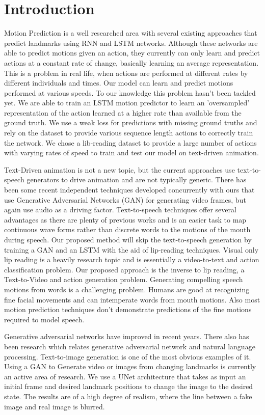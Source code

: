 \documentclass[10pt,twocolumn,letterpaper]{article}
\begin{document}
\section{Introduction}
 Motion Prediction is a well researched area with several existing approaches that predict landmarks using RNN and LSTM networks. Although these networks are able to predict motions given an action, they currently can only learn and predict actions at a constant rate of change, basically learning an average representation. This is a problem in real life, when actions are performed at different rates by different individuals and times. Our model can learn and predict motions performed at various speeds. To our knowledge this problem hasn't been tackled yet. We are able to train an LSTM motion predictor to learn an 'oversampled' representation of the action learned at a higher rate than available from the ground truth. We use a weak loss for predictions with missing ground truths and rely on the dataset to provide various sequence length actions to correctly train the network. We chose a lib-reading dataset to provide a large number of actions with varying rates of speed to train and test our model on text-driven animation.

 Text-Driven animation is not a new topic, but the current approaches use text-to-speech generators to drive animation and are not typically generic. There has been some recent independent techniques developed concurrently with ours that use Generative Adversarial Networks (GAN) for generating video frames, but again use audio as a driving factor. Text-to-speech techniques offer several advantages as there are plenty of previous works and is an easier task to map continuous wave forms rather than discrete words to the motions of the mouth during speech. Our proposed method will skip the text-to-speech generation by training a GAN and an LSTM with the aid of lip-reading techniques. Visual only lip reading is a heavily research topic and is essentially a video-to-text and action classification problem. Our proposed approach is the inverse to lip reading, a Text-to-Video and action generation problem. Generating compelling speech motions from words is a challenging problem. Humans are good at recognizing fine facial movements and can intemperate words from mouth motions. Also most motion prediction techniques don't demonstrate predictions of the fine motions required to model speech.

 Generative adversarial networks have improved in recent years. There also has been research which relates generative adversarial network and natural language processing. Text-to-image generation is one of the most obvious examples of it. Using a GAN to Generate video or images from changing landmarks is currently an active area of research. We use a UNet architecture that takes as input an initial frame and desired landmark positions to change the image to the desired state. The results are of a high degree of realism, where the line between a fake image and real image is blurred.
 
\end{document}
